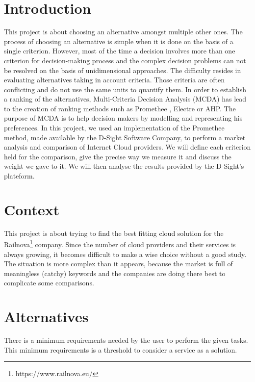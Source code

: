 \documentclass[a4paper,11pt]{article}
\begin{document}
\section{Introduction}
This project is about choosing an alternative amongst multiple other ones. The process of choosing an alternative is simple when it is done on the basis of a single criterion. However, most of the time a decision involves more than one criterion for decision-making process and the complex decision problems can not be resolved on the basis of unidimensional approaches. The difficulty resides in evaluating alternatives taking in account criteria. Those criteria are often conflicting and do not use the same units to quantify them. In order to establish a ranking of the alternatives, Multi-Criteria Decision Analysis (MCDA) has lead to the creation of ranking methods such as Promethee , Electre or AHP. The purpose of MCDA is to help decision makers by modelling and representing his preferences. In this project, we used an implementation of the Promethee method, made available by the D-Sight Software Company, to perform a market analysis and comparison of Internet \og Cloud \fg{} providers. We will define each criterion held for the comparison, give the precise way we measure it and discuss the weight we gave to it. We will then analyse the results provided by the D-Sight's plateform.\\ %


\section{Context}
This project is about trying to find the best fitting cloud solution for the Railnova\footnote{https://www.railnova.eu/} company. Since the number of cloud providers and their services is always growing, it becomes difficult to make a wise choice without a good study. The situation is more complex than it appears, because the market is full of meaningless (catchy) keywords and the companies are doing there best to complicate some comparisons.


\section{Alternatives}
There is a minimum requirements needed by the user to perform the given tasks. This minimum requirements is a threshold to consider a service as a solution.\\
\end{document}
